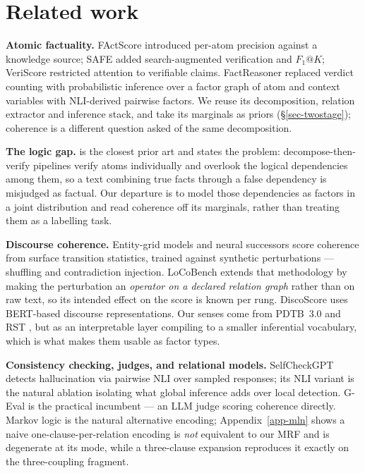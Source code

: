 \documentclass{article} %
\begin{document}
\section{Related work}
\label{sec-related}

\textbf{Atomic factuality.} FActScore \citep{factscore} introduced per-atom precision against
a knowledge source; SAFE \citep{safe} added search-augmented verification and $F_1@K$;
VeriScore \citep{veriscore} restricted attention to verifiable claims. FactReasoner
\citep{factreasoner} replaced verdict counting with probabilistic inference over a factor graph
of atom and context variables with NLI-derived pairwise factors. We reuse its decomposition,
relation extractor and inference stack, and take its marginals as priors
(\S\ref{sec-twostage}); coherence is a different question asked of the same decomposition.

\textbf{The logic gap.} \citet{lorefact} is the closest prior art and states the problem:
decompose-then-verify pipelines verify atoms individually and overlook the logical dependencies
among them, so a text combining true facts through a false dependency is misjudged as factual.
Our departure is to model those dependencies as factors in a joint distribution and read
coherence off its marginals, rather than treating them as a labelling task.

\textbf{Discourse coherence.} Entity-grid models \citep{barzilay} and neural successors
\citep{li} score coherence from surface transition statistics, trained against synthetic
perturbations --- shuffling and contradiction injection. LoCoBench extends that methodology by
making the perturbation an \emph{operator on a declared relation graph} rather than on raw
text, so its intended effect on the score is known per rung. DiscoScore \citep{discoscore} uses
BERT-based discourse representations. Our senses come from PDTB~3.0 \citep{pdtb} and RST
\citep{mann}, but as an interpretable layer compiling to a smaller inferential vocabulary,
which is what makes them usable as factor types.

\textbf{Consistency checking, judges, and relational models.} SelfCheckGPT
\citep{selfcheckgpt} detects hallucination via pairwise NLI over sampled responses; its NLI
variant is the natural ablation isolating what global inference adds over local detection.
G-Eval \citep{geval} is the practical incumbent --- an LLM judge scoring coherence directly.
Markov logic \citep{mln} is the natural alternative encoding; Appendix~\ref{app-mln} shows a
naive one-clause-per-relation encoding is \emph{not} equivalent to our MRF and is degenerate at
its mode, while a three-clause expansion reproduces it exactly on the three-coupling
fragment.
\end{document}
